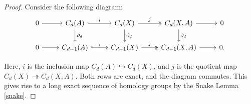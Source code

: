 \begin{proof}
	Consider the following diagram:
	\begin{equation}
		\begin{tikzcd}
			0 \arrow[r] & C_d(A) \arrow[r, "i", hook] \arrow[d, "\partial_d"] & C_d(X) \arrow[r, "j", two heads] \arrow[d, "\partial_d"] & C_d(X, A) \arrow[r] \arrow[d, "\partial_d"] & 0 \\
			0 \arrow[r] & C_{d-1}(A) \arrow[r, "i", hook] & C_{d-1}(X) \arrow[r, "j", two heads] & C_{d-1}(X, A) \arrow[r] & 0.
		\end{tikzcd}
	\end{equation}
			
	Here, \(i\) is the inclusion map \(C_{d}(A) \hookrightarrow C_{d}(X)\), and \(j\) is the quotient map \(C_{d}(X) \twoheadrightarrow C_{d}(X, A)\). Both rows are exact, and the diagram commutes. This gives rise to a long exact sequence of homology groups by the Snake Lemma \ref{snake}.
			

\end{proof}
